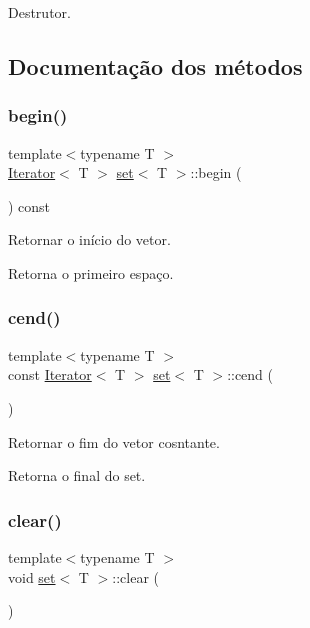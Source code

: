 Destrutor. 



\subsection{Documentação dos métodos}
\mbox{\label{classset_a67103bfe5a350e3523f50021b2786c09}} 
\subsubsection{\texorpdfstring{begin()}{begin()}}
{\footnotesize\ttfamily template$<$typename T $>$ \\
\hyperlink{classIterator}{Iterator}$<$ T $>$ \hyperlink{classset}{set}$<$ T $>$\+::begin (\begin{DoxyParamCaption}{ }\end{DoxyParamCaption}) const}



Retornar o início do vetor. 

Retorna o primeiro espaço. \mbox{\label{classset_a3c0619e697c559705bf589f70d70b807}} 
\subsubsection{\texorpdfstring{cend()}{cend()}}
{\footnotesize\ttfamily template$<$typename T $>$ \\
const \hyperlink{classIterator}{Iterator}$<$ T $>$ \hyperlink{classset}{set}$<$ T $>$\+::cend (\begin{DoxyParamCaption}{ }\end{DoxyParamCaption})}



Retornar o fim do vetor cosntante. 

Retorna o final do set. \mbox{\label{classset_af787aa896950934584af154fc92e4e5a}} 
\subsubsection{\texorpdfstring{clear()}{clear()}}
{\footnotesize\ttfamily template$<$typename T $>$ \\
void \hyperlink{classset}{set}$<$ T $>$\+::clear (\begin{DoxyParamCaption}{ }\end{DoxyParamCaption})}



